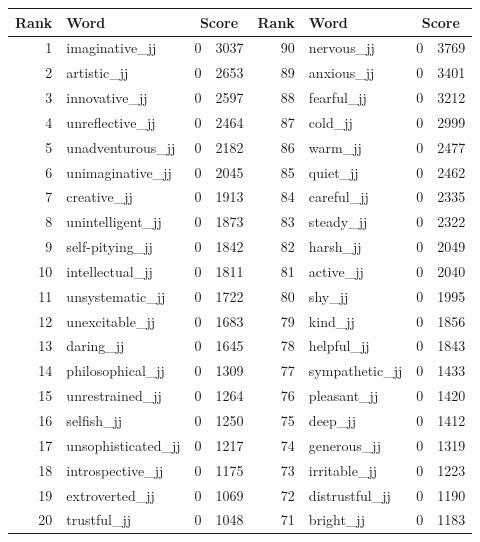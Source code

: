 \begin{table}[tbp]
    \begin{tabular}{| rlr@{.}l | rlr@{.}l |}
    \hline
    \textbf{Rank} & \textbf{Word} & \multicolumn{2}{c|}{\textbf{Score}} & \textbf{Rank} & \textbf{Word} & \multicolumn{2}{c|}{\textbf{Score}} \\
    \hline
    1 & imaginative\_jj & 0 & 3037    &    90 & nervous\_jj & 0 & 3769 \\
    2 & artistic\_jj & 0 & 2653    &    89 & anxious\_jj & 0 & 3401 \\
    3 & innovative\_jj & 0 & 2597    &    88 & fearful\_jj & 0 & 3212 \\
    4 & unreflective\_jj & 0 & 2464    &    87 & cold\_jj & 0 & 2999 \\
    5 & unadventurous\_jj & 0 & 2182    &    86 & warm\_jj & 0 & 2477 \\
    6 & unimaginative\_jj & 0 & 2045    &    85 & quiet\_jj & 0 & 2462 \\
    7 & creative\_jj & 0 & 1913    &    84 & careful\_jj & 0 & 2335 \\
    8 & unintelligent\_jj & 0 & 1873    &    83 & steady\_jj & 0 & 2322 \\
    9 & self-pitying\_jj & 0 & 1842    &    82 & harsh\_jj & 0 & 2049 \\
    10 & intellectual\_jj & 0 & 1811    &    81 & active\_jj & 0 & 2040 \\
    11 & unsystematic\_jj & 0 & 1722    &    80 & shy\_jj & 0 & 1995 \\
    12 & unexcitable\_jj & 0 & 1683    &    79 & kind\_jj & 0 & 1856 \\
    13 & daring\_jj & 0 & 1645    &    78 & helpful\_jj & 0 & 1843 \\
    14 & philosophical\_jj & 0 & 1309    &    77 & sympathetic\_jj & 0 & 1433 \\
    15 & unrestrained\_jj & 0 & 1264    &    76 & pleasant\_jj & 0 & 1420 \\
    16 & selfish\_jj & 0 & 1250    &    75 & deep\_jj & 0 & 1412 \\
    17 & unsophisticated\_jj & 0 & 1217    &    74 & generous\_jj & 0 & 1319 \\
    18 & introspective\_jj & 0 & 1175    &    73 & irritable\_jj & 0 & 1223 \\
    19 & extroverted\_jj & 0 & 1069    &    72 & distrustful\_jj & 0 & 1190 \\
    20 & trustful\_jj & 0 & 1048    &    71 & bright\_jj & 0 & 1183 \\

\end{tabular}
\end{table}
